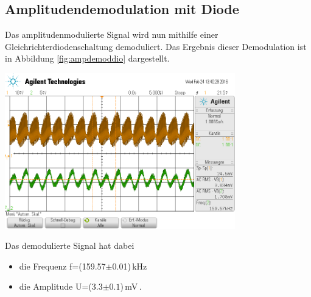 \documentclass[]{scrartcl}
\begin{document}
\subsection{Amplitudendemodulation mit Diode}
Das amplitudenmodulierte Signal wird nun mithilfe einer Gleichrichterdiodenschaltung demoduliert. Das Ergebnis dieser Demodulation ist in Abbildung \ref{fig:ampdemoddio} dargestellt. 
\begin{center}
	\includegraphics[width=10cm]{images/ampdemoddio.png}
	\label{fig:ampdemoddio}
\end{center}
Das demodulierte Signal hat dabei
\begin{itemize}
	\item die Frequenz f=(159.57$\pm$0.01)\,kHz
	\item die Amplitude U=(3.3$\pm0.1$)\,mV\,.
\end{itemize}
\end{document}
